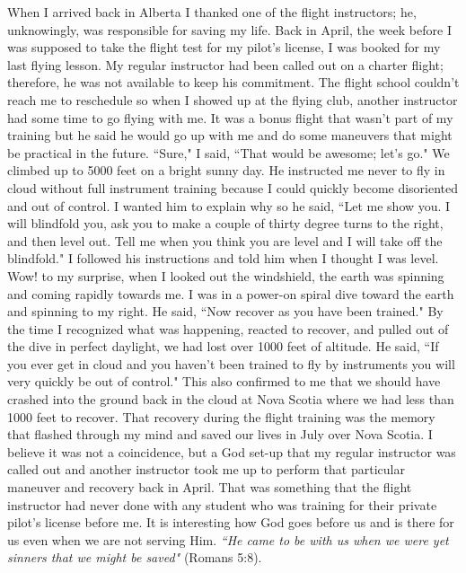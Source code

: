 \documentclass[oneside,12pt]{book}
\begin{document}
When I arrived back in Alberta I thanked one of the flight instructors; he, unknowingly, was responsible for saving my life. Back in April, the week before I was supposed to take the flight test for my pilot's license, I was booked for my last flying lesson. My regular instructor had been called out on a charter flight; therefore, he was not available to keep his commitment. The flight school couldn't reach me to reschedule so when I showed up at the flying club, another instructor had some time to go flying with me. It was a bonus flight that wasn't part of my training but he said he would go up with me and do some maneuvers that might be practical in the future. ``Sure," I said, ``That would be awesome; let's go." We climbed up to 5000 feet on a bright sunny day. He instructed me never to fly in cloud without full instrument training because I could quickly become disoriented and out of control. I wanted him to explain why so he said, ``Let me show you. I will blindfold you, ask you to make a couple of thirty degree turns to the right, and then level out. Tell me when you think you are level and I will take off the blindfold." I followed his instructions and told him when I thought I was level. Wow! to my surprise, when I looked out the windshield, the earth was spinning and coming rapidly towards me. I was in a power-on spiral dive toward the earth and spinning to my right. He said, ``Now recover as you have been trained." By the time I recognized what was happening, reacted to recover, and pulled out of the dive in perfect daylight, we had lost over 1000 feet of altitude. He said, ``If you ever get in cloud and you haven't been trained to fly by instruments you will very quickly be out of control." This also confirmed to me that we should have crashed into the ground back in the cloud at Nova Scotia where we had less than 1000 feet to recover. That recovery during the flight training was the memory that flashed through my mind and saved our lives in July over Nova Scotia. I believe it was not a coincidence, but a God set-up that my regular instructor was called out and another instructor took me up to perform that particular maneuver and recovery back in April. That was something that the flight instructor had never done with any student who was training for their private pilot's license before me. It is interesting how God goes before us and is there for us even when we are not serving Him. \textit{``He came to be with us when we were yet sinners that we might be saved"} (Romans 5:8). 
\end{document}

